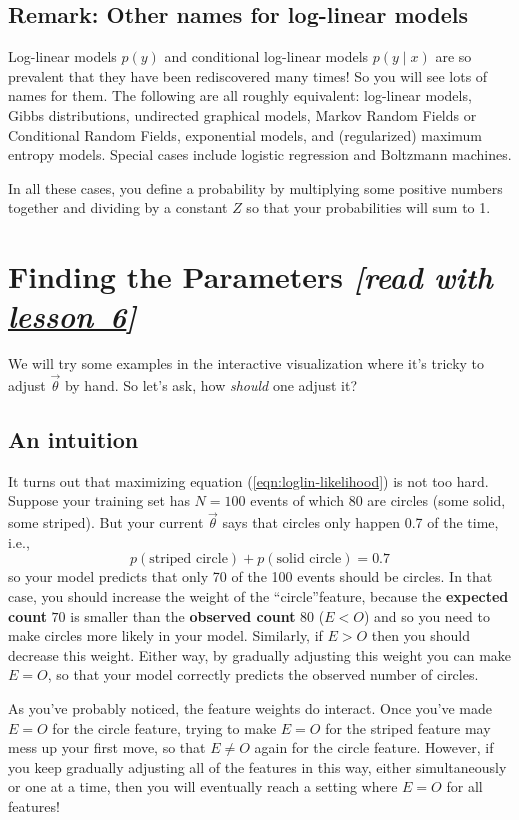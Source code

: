 \documentclass[11pt]{article}
\newcommand{\vtheta}{\vec{\theta}}
\newcommand{\lesson}[1]{\href{http://cs.jhu.edu/~jason/tutorials/loglin/\##1}{lesson~#1}}
\begin{document}
\subsection{Remark: Other names for log-linear models}

Log-linear models $p(y)$ and conditional log-linear models
$p(y\mid x)$ are so prevalent that they have been rediscovered many
times!  So you will see lots of names for them.  The following are all
roughly equivalent: log-linear models, Gibbs distributions, undirected
graphical models, Markov Random Fields or Conditional Random Fields,
exponential models, and (regularized) maximum entropy models.
Special cases include logistic regression and Boltzmann machines.

\medskip
In all these cases, you define a probability by multiplying some
positive numbers together and dividing by a constant $Z$ so that your
probabilities will sum to 1.

\section{Finding the Parameters {\em [read with \lesson{6}]}}

We will try some examples in the interactive visualization where it's
tricky to adjust $\vtheta$ by hand.  So let's ask, how {\em should}
one adjust it?

\subsection{An intuition}

It turns out that maximizing equation (\ref{eqn:loglin-likelihood}) is
not too hard.  Suppose your training set has $N=100$ events of which
80 are circles (some solid, some striped).  But your current $\vtheta$
says that circles only happen 0.7 of the time, i.e.,
$$p(\textrm{striped circle}) + p(\textrm{solid circle}) = 0.7$$
so your model predicts that only 70 of the 100 events should be circles.
%
In that case, you should increase the weight of the ``circle''feature,
because the {\bf expected count} $70$ is smaller than the {\bf
  observed count} $80$ ($E < O$) and so you need to make circles more
likely in your model.  Similarly, if $E > O$ then you should decrease this weight.
Either way, by gradually adjusting this weight you can make $E=O$, so
that your model correctly predicts the observed number of circles.

\medskip
As you've probably noticed, the feature weights do interact.  Once
you've made $E=O$ for the circle feature, trying to make $E=O$ for the
striped feature may mess up your first move, so that $E \neq O$ again
for the circle feature.  However, if you keep gradually adjusting all
of the features in this way, either simultaneously or one at a time,
then you will eventually reach a setting where $E=O$ for all features!
\end{document}
